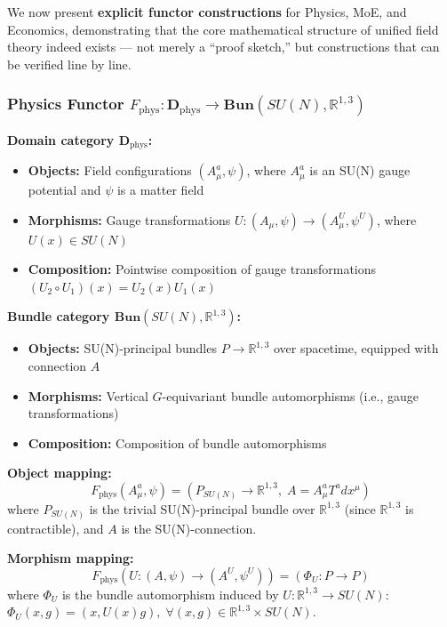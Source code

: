 \documentclass[12pt,a4paper]{article}
\theoremstyle{plain}
\theoremstyle{definition}
\newcommand{\R}{\mathbb{R}}
\begin{document}
We now present \textbf{explicit functor constructions} for Physics, MoE, and Economics, demonstrating that the core mathematical structure of unified field theory indeed exists
— not merely a ``proof sketch,'' but constructions that can be verified line by line.

\subsubsection{Physics Functor $F_{\text{phys}}: \mathbf{D}_{\text{phys}} \to \mathbf{Bun}(SU(N), \R^{1,3})$}

\textbf{Domain category $\mathbf{D}_{\text{phys}}$:}
\begin{itemize}
    \item \textbf{Objects:} Field configurations $(A_\mu^a, \psi)$, where $A_\mu^a$ is an SU(N) gauge potential and $\psi$ is a matter field
    \item \textbf{Morphisms:} Gauge transformations $U: (A_\mu, \psi) \to (A_\mu^U, \psi^U)$, where $U(x) \in SU(N)$
    \item \textbf{Composition:} Pointwise composition of gauge transformations $(U_2 \circ U_1)(x) = U_2(x)U_1(x)$
\end{itemize}

\textbf{Bundle category $\mathbf{Bun}(SU(N), \R^{1,3})$:}
\begin{itemize}
    \item \textbf{Objects:} SU(N)-principal bundles $P \to \R^{1,3}$ over spacetime, equipped with connection $A$
    \item \textbf{Morphisms:} Vertical $G$-equivariant bundle automorphisms (i.e., gauge transformations)
    \item \textbf{Composition:} Composition of bundle automorphisms
\end{itemize}

\textbf{Object mapping:}
\begin{equation}
    F_{\text{phys}}(A_\mu^a, \psi) = (P_{SU(N)} \to \R^{1,3}, \; A = A_\mu^a T^a dx^\mu)
\end{equation}
where $P_{SU(N)}$ is the trivial SU(N)-principal bundle over $\R^{1,3}$ (since $\R^{1,3}$ is contractible), and $A$ is the SU(N)-connection.

\textbf{Morphism mapping:}
\begin{equation}
    F_{\text{phys}}(U: (A,\psi) \to (A^U, \psi^U)) = (\Phi_U: P \to P)
\end{equation}
where $\Phi_U$ is the bundle automorphism induced by $U: \R^{1,3} \to SU(N)$:
$\Phi_U(x, g) = (x, U(x)g), \; \forall (x,g) \in \R^{1,3} \times SU(N)$.
\end{document}
